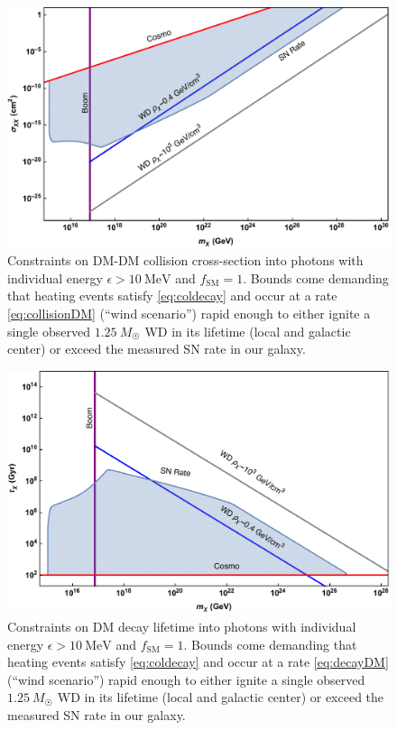 \documentclass[twocolumn, preprintnumbers,amsmath,amssymb,prd, superscriptaddress]{revtex4}
\begin{document}
\begin{figure}
\includegraphics[scale=.35]{collisionobservation.pdf}
\caption{Constraints on DM-DM collision cross-section into photons with individual energy $\epsilon > 10~\text{MeV}$ and $f_\text{SM} = 1$. Bounds come demanding that heating events satisfy \eqref{eq:coldecay} and occur at a rate \eqref{eq:collisionDM} (``wind scenario'') rapid enough to either ignite a single observed $1.25~M_{\astrosun}$ WD in its lifetime (local and galactic center) or exceed the measured SN rate in our galaxy.}
\label{fig:collisionclasses}
\end{figure}

\begin{figure}
\includegraphics[scale=.35]{decayobservation.pdf}
\caption{Constraints on DM decay lifetime into photons with individual energy $\epsilon > 10~\text{MeV}$ and $f_\text{SM} = 1$. Bounds come demanding that heating events satisfy \eqref{eq:coldecay} and occur at a rate \eqref{eq:decayDM} (``wind scenario'') rapid enough to either ignite a single observed $1.25~M_{\astrosun}$ WD in its lifetime (local and galactic center) or exceed the measured SN rate in our galaxy.}
\label{fig:decayclasses}
\end{figure}
\end{document}
